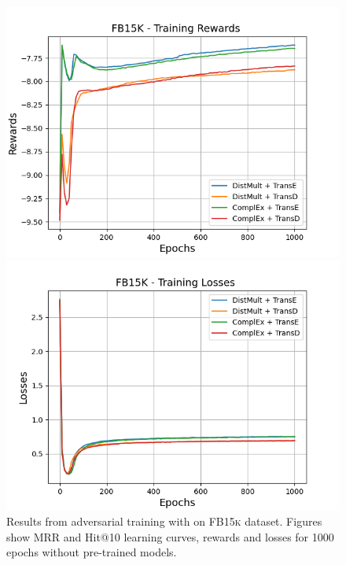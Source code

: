 \begin{figure}[H]
    \begin{minipage}{.45\textwidth}
      \centering
      \includegraphics[width=0.9\linewidth]{figures/results/gan_train/not_pretrained/random/fb15k/1k_epochs/random_fb15k_rew.png}
    \end{minipage}%
     \begin{minipage}{.45\textwidth}
      \centering
      \includegraphics[width=0.9\linewidth]{figures/results/gan_train/not_pretrained/random/fb15k/1k_epochs/random_fb15k_losses.png}
    \end{minipage}%
    \caption{Results from adversarial training with \origsampling on \textsc{FB15k} dataset.
    Figures show MRR and Hit@10 learning curves, rewards and losses for 1000 epochs without pre-trained models.}
    \label{fig:gan_train_not_pretrained_random_fb15k}
\end{figure}
